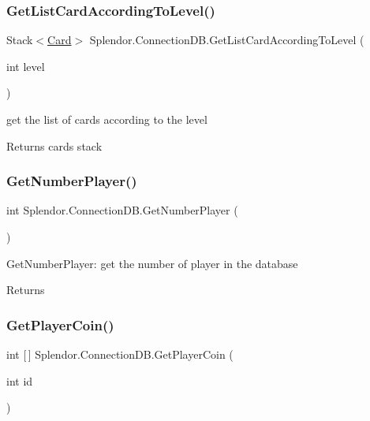 \subsubsection{\texorpdfstring{Get\+List\+Card\+According\+To\+Level()}{GetListCardAccordingToLevel()}}
{\footnotesize\ttfamily Stack$<$\hyperlink{class_splendor_1_1_card}{Card}$>$ Splendor.\+Connection\+D\+B.\+Get\+List\+Card\+According\+To\+Level (\begin{DoxyParamCaption}\item[{int}]{level }\end{DoxyParamCaption})}



get the list of cards according to the level 

\begin{DoxyReturn}{Returns}
cards stack
\end{DoxyReturn}
\mbox{\label{class_splendor_1_1_connection_d_b_a59283e3daafb9028e5334f9c32759d23}} 
\subsubsection{\texorpdfstring{Get\+Number\+Player()}{GetNumberPlayer()}}
{\footnotesize\ttfamily int Splendor.\+Connection\+D\+B.\+Get\+Number\+Player (\begin{DoxyParamCaption}{ }\end{DoxyParamCaption})}



Get\+Number\+Player\+: get the number of player in the database 

\begin{DoxyReturn}{Returns}

\end{DoxyReturn}
\mbox{\label{class_splendor_1_1_connection_d_b_aa041b47c2907ae59eb0f3745f4b12744}} 
\subsubsection{\texorpdfstring{Get\+Player\+Coin()}{GetPlayerCoin()}}
{\footnotesize\ttfamily int \mbox{[}$\,$\mbox{]} Splendor.\+Connection\+D\+B.\+Get\+Player\+Coin (\begin{DoxyParamCaption}\item[{int}]{id }\end{DoxyParamCaption})}



